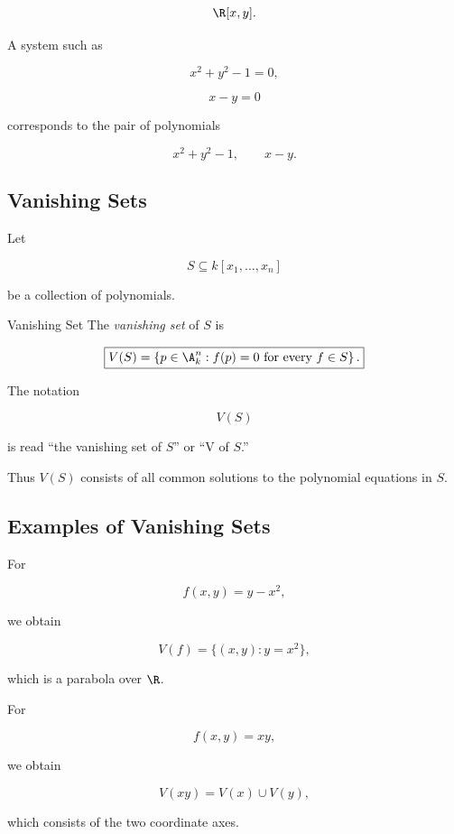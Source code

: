 \[
\R[x,y].
\]

A system such as

\[
x^2+y^2-1=0,
\]

\[
x-y=0
\]

corresponds to the pair of polynomials

\[
x^2+y^2-1,
\qquad
x-y.
\]

\subsection{Vanishing Sets}
\label{subsec:vanishing-sets}

Let

\[
S\subseteq k[x_1,\ldots,x_n]
\]

be a collection of polynomials.

\begin{definitionbox}{Vanishing Set}
The \emph{vanishing set} of \(S\) is

\[
\boxed{
V(S)
=
\left\{
p\in\A^n_k:
f(p)=0
\text{ for every }f\in S
\right\}.
}
\]
\end{definitionbox}

The notation

\[
V(S)
\]

is read ``the vanishing set of \(S\)'' or ``V of \(S\).''

Thus \(V(S)\) consists of all common solutions to the polynomial equations
in \(S\).

\subsection{Examples of Vanishing Sets}
\label{subsec:vanishing-set-examples}

For

\[
f(x,y)=y-x^2,
\]

we obtain

\[
\boxed{
V(f)=\{(x,y):y=x^2\},
}
\]

which is a parabola over \(\R\).

For

\[
f(x,y)=xy,
\]

we obtain

\[
\boxed{
V(xy)=V(x)\cup V(y),
}
\]

which consists of the two coordinate axes.

